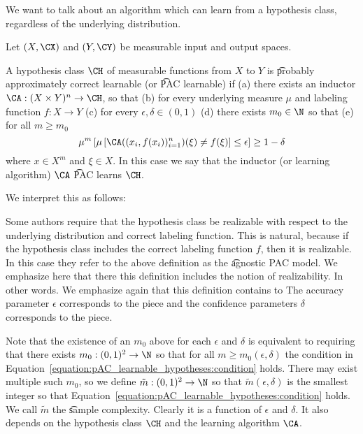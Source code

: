 

We want to talk about an algorithm which can learn from a hypothesis class, regardless of the underlying distribution.


Let $(X, \CX)$ and $(Y, \CY)$ be measurable input and output spaces.

A hypothesis class $\CH$ of measurable functions from $X$ to $Y$ is \t{probably approximately correct learnable} (or \t{PAC learnable}) if
(a) there exists an inductor $\CA: (X \times Y)^n \to \CH$, so that (b) for every underlying measure $\mu$ and labeling function $f: X \to Y$ (c) for every $\epsilon, \delta \in (0, 1)$ (d) there exists $m_0 \in \N$ so that (e) for all $m \geq m_0$
\begin{equation}
  \mu^m\left[
  	\mu\left[
  		\CA((x_i, f(x_i))_{i = 1}^{n})(\xi) \neq f(\xi)
  		\right]
  	\leq \epsilon \right] \geq 1-\delta
  	\label{equation:pAC_learnable_hypotheses:condition}
\end{equation}
where $x \in X^m$ and $\xi \in X$.
In this case we say that the inductor (or learning algorithm) $\CA$ \t{PAC learns} $\CH$.

We interpret this as follows: 

Some authors require that the hypothesis class be realizable with respect to the underlying distribution and correct labeling function.
This is natural, because if the hypothesis class includes the correct labeling function $f$, then it is realizable.
In this case they refer to the above definition as the \t{agnostic PAC model}.
We emphasize here that there this definition includes the notion of realizability.
In other words.
We emphasize again that this definition contains to 
The accuracy parameter $\epsilon$ corresponds to the  piece and the confidence parameters $\delta$ corresponds to the  piece.


Note that the existence of an $m_0$ above for each $\epsilon$ and $\delta$ is equivalent to requiring that there exists  $m_0: (0, 1)^2 \to \N$ so that for all $m \geq m_0(\epsilon,\delta)$ the condition in Equation~\ref{equation:pAC_learnable_hypotheses:condition} holds.
There may exist multiple such $m_0$, so we define $\tilde{m}: (0, 1)^2 \to \N$ so that $\tilde{m}(\epsilon,\delta)$ is the smallest integer so that Equation~\eqref{equation:pAC_learnable_hypotheses:condition} holds.
We call $\tilde{m}$ the \t{sample complexity}.
Clearly it is a function of $\epsilon$ and $\delta$.
It also depends on the hypothesis class $\CH$ and the learning algorithm $\CA$.

\blankpage
